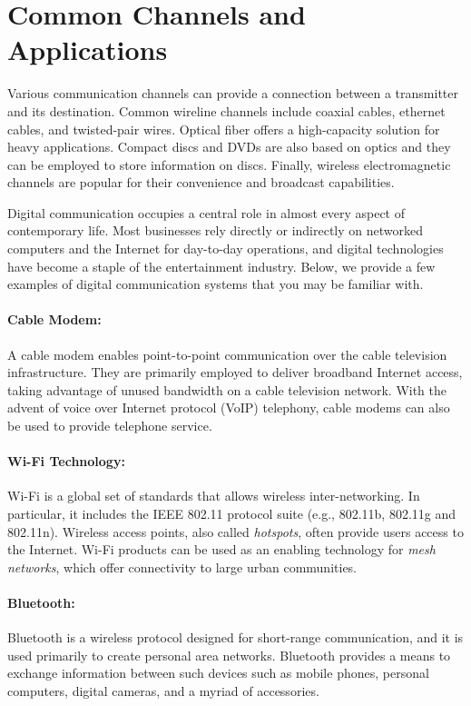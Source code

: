 \section{Common Channels and Applications}

Various communication channels can provide a connection between a transmitter and its destination.
Common wireline channels include coaxial cables, ethernet cables, and twisted-pair wires.
Optical fiber offers a high-capacity solution for heavy applications.
Compact discs and DVDs are also based on optics and they can be employed to store information on discs.
Finally, wireless electromagnetic channels are popular for their convenience and broadcast capabilities.

Digital communication occupies a central role in almost every aspect of contemporary life.
Most businesses rely directly or indirectly on networked computers and the Internet for day-to-day operations, and digital technologies have become a staple of the entertainment industry.
Below, we provide a few examples of digital communication systems that you may be familiar with.

\paragraph{Cable Modem:}
A cable modem enables point-to-point communication over the cable television infrastructure.
They are primarily employed to deliver broadband Internet access, taking advantage of unused bandwidth on a cable television network.
With the advent of voice over Internet protocol (VoIP) telephony, cable modems can also be used to provide telephone service.

\paragraph{Wi-Fi Technology:}
Wi-Fi is a global set of standards that allows wireless inter-networking.
In particular, it includes the IEEE 802.11 protocol suite (e.g., 802.11b, 802.11g and 802.11n).
Wireless access points, also called \emph{hotspots}, often provide users access to the Internet.
Wi-Fi products can be used as an enabling technology for \emph{mesh networks}, which offer connectivity to large urban communities.

\paragraph{Bluetooth:}
Bluetooth is a wireless protocol designed for short-range communication, and it is used primarily to create personal area networks.
Bluetooth provides a means to exchange information between such devices such as mobile phones, personal computers, digital cameras, and a myriad of accessories.

